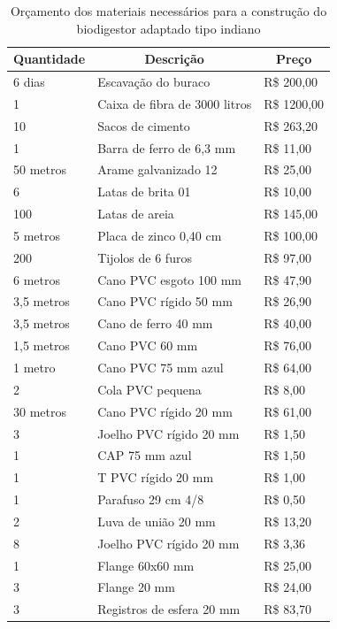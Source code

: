 \begin{table}[]
\centering
\caption{Orçamento dos materiais necessários para a construção do biodigestor adaptado tipo indiano}
\begin{tabular}{|l|l|l|}
\multicolumn{1}{c}{\textbf{Quantidade}} & \multicolumn{1}{c}{\textbf{Descrição}} & \multicolumn{1}{c}{\textbf{Preço}} \\ \hline
6 dias & Escavação do buraco & R\$ 200,00\\ \hline
1 & Caixa de fibra de 3000 litros & R\$ 1200,00 \\ \hline
10 & Sacos de cimento & R\$ 263,20 \\ \hline
1 & Barra de ferro de 6,3 mm & R\$ 11,00 \\ \hline
50 metros & Arame galvanizado 12 & R\$ 25,00 \\ \hline
6 & Latas de brita 01 & R\$ 10,00 \\ \hline
100 & Latas de areia & R\$ 145,00 \\ \hline
5 metros & Placa de zinco 0,40 cm & R\$ 100,00 \\ \hline
200 & Tijolos de 6 furos & R\$ 97,00 \\ \hline
6 metros & Cano PVC esgoto 100 mm & R\$ 47,90 \\ \hline
3,5 metros & Cano PVC rígido 50 mm & R\$ 26,90 \\ \hline
3,5 metros & Cano de ferro 40 mm & R\$ 40,00 \\ \hline
1,5 metros & Cano PVC 60 mm & R\$ 76,00 \\ \hline
1 metro & Cano PVC 75 mm azul & R\$ 64,00 \\ \hline
2 & Cola PVC pequena & R\$ 8,00 \\ \hline
30 metros & Cano PVC rígido 20 mm & R\$ 61,00 \\ \hline
3 & Joelho PVC rígido 20 mm & R\$ 1,50 \\ \hline
1 & CAP 75 mm azul & R\$ 1,50 \\ \hline
1 & T PVC rígido 20 mm & R\$ 1,00 \\ \hline
1 & Parafuso 29 cm 4/8 & R\$ 0,50 \\ \hline
2 & Luva de união 20 mm & R\$ 13,20 \\ \hline
8 & Joelho PVC rígido 20 mm & R\$ 3,36 \\ \hline
1 & Flange 60x60 mm & R\$ 25,00 \\ \hline
3 & Flange 20 mm & R\$ 24,00 \\ \hline
3 & Registros de esfera 20 mm & R\$ 83,70 \\ \hline

\end{tabular}
\end{table}
